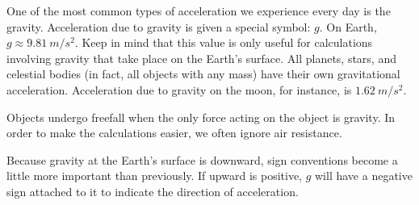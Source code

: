 One of the most common types of acceleration we experience every day is the \gls{gravity}.   Acceleration due to gravity is given a special symbol: $g$.  On Earth, $g \approx  \SI{9.81}{m/s^2}$.  Keep in mind that this value is only useful for calculations involving gravity that take place on the Earth's surface.  All planets, stars, and celestial bodies (in fact, all objects with any mass) have their own gravitational acceleration.  Acceleration due to gravity on the moon, for instance, is $\SI{1.62}{m/s^2}$.    

Objects undergo \gls{freefall} when the only force acting on the object is gravity.  In order to make the calculations easier, we often ignore air resistance.

Because gravity at the Earth's surface is downward, sign conventions become a little more important than previously.  If upward is positive, $g$ will have a negative sign attached to it to indicate the direction of acceleration.  


